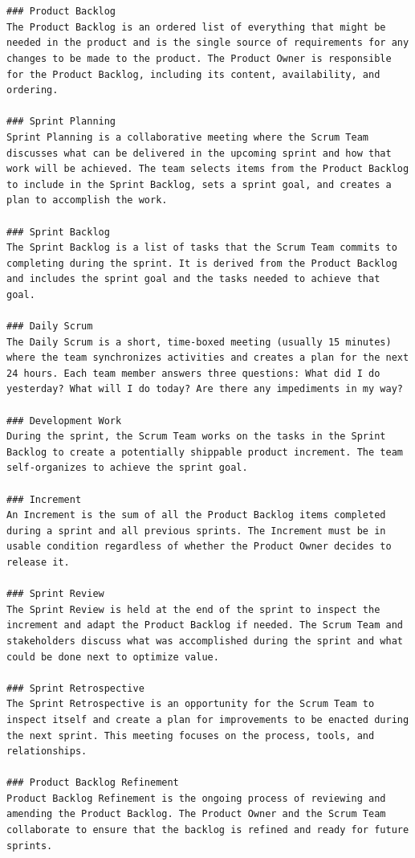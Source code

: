 \documentclass[
  letterpaper,
  DIV=11,
  numbers=noendperiod]{scrreprt}
\begin{document}
\begin{verbatim}


### Product Backlog
The Product Backlog is an ordered list of everything that might be needed in the product and is the single source of requirements for any changes to be made to the product. The Product Owner is responsible for the Product Backlog, including its content, availability, and ordering.

### Sprint Planning
Sprint Planning is a collaborative meeting where the Scrum Team discusses what can be delivered in the upcoming sprint and how that work will be achieved. The team selects items from the Product Backlog to include in the Sprint Backlog, sets a sprint goal, and creates a plan to accomplish the work.

### Sprint Backlog
The Sprint Backlog is a list of tasks that the Scrum Team commits to completing during the sprint. It is derived from the Product Backlog and includes the sprint goal and the tasks needed to achieve that goal.

### Daily Scrum
The Daily Scrum is a short, time-boxed meeting (usually 15 minutes) where the team synchronizes activities and creates a plan for the next 24 hours. Each team member answers three questions: What did I do yesterday? What will I do today? Are there any impediments in my way?

### Development Work
During the sprint, the Scrum Team works on the tasks in the Sprint Backlog to create a potentially shippable product increment. The team self-organizes to achieve the sprint goal.

### Increment
An Increment is the sum of all the Product Backlog items completed during a sprint and all previous sprints. The Increment must be in usable condition regardless of whether the Product Owner decides to release it.

### Sprint Review
The Sprint Review is held at the end of the sprint to inspect the increment and adapt the Product Backlog if needed. The Scrum Team and stakeholders discuss what was accomplished during the sprint and what could be done next to optimize value.

### Sprint Retrospective
The Sprint Retrospective is an opportunity for the Scrum Team to inspect itself and create a plan for improvements to be enacted during the next sprint. This meeting focuses on the process, tools, and relationships.

### Product Backlog Refinement
Product Backlog Refinement is the ongoing process of reviewing and amending the Product Backlog. The Product Owner and the Scrum Team collaborate to ensure that the backlog is refined and ready for future sprints.


\end{verbatim}
\end{document}
